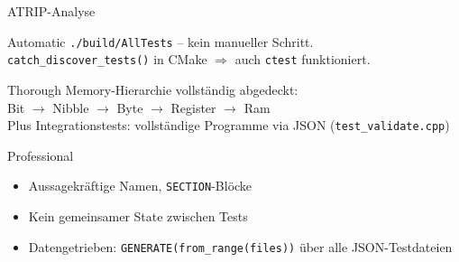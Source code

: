 \documentclass[10pt]{beamer}
\begin{document}
\begin{frame}{ATRIP-Analyse}
    \begin{block}{Automatic}
        \texttt{./build/AllTests} -- kein manueller Schritt.\\
        \texttt{catch\_discover\_tests()} in CMake $\Rightarrow$ auch \texttt{ctest} funktioniert.
    \end{block}
    \vspace{0.3em}
    \begin{block}{Thorough}
        Memory-Hierarchie vollständig abgedeckt:\\
        Bit $\rightarrow$ Nibble $\rightarrow$ Byte $\rightarrow$ Register $\rightarrow$ Ram\\
        Plus Integrationstests: vollständige Programme via JSON (\texttt{test\_validate.cpp})
    \end{block}
    \vspace{0.3em}
    \begin{block}{Professional}
        \begin{itemize}
            \item Aussagekräftige Namen, \texttt{SECTION}-Blöcke
            \item Kein gemeinsamer State zwischen Tests
            \item Datengetrieben: \texttt{GENERATE(from\_range(files))} über alle JSON-Testdateien
        \end{itemize}
    \end{block}
\end{frame}
\end{document}
